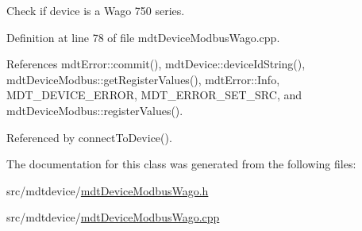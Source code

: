 Check if device is a Wago 750 series. 



Definition at line 78 of file mdt\-Device\-Modbus\-Wago.\-cpp.



References mdt\-Error\-::commit(), mdt\-Device\-::device\-Id\-String(), mdt\-Device\-Modbus\-::get\-Register\-Values(), mdt\-Error\-::\-Info, M\-D\-T\-\_\-\-D\-E\-V\-I\-C\-E\-\_\-\-E\-R\-R\-O\-R, M\-D\-T\-\_\-\-E\-R\-R\-O\-R\-\_\-\-S\-E\-T\-\_\-\-S\-R\-C, and mdt\-Device\-Modbus\-::register\-Values().



Referenced by connect\-To\-Device().



The documentation for this class was generated from the following files\-:\begin{DoxyCompactItemize}
\item 
src/mdtdevice/\hyperlink{mdt_device_modbus_wago_8h}{mdt\-Device\-Modbus\-Wago.\-h}\item 
src/mdtdevice/\hyperlink{mdt_device_modbus_wago_8cpp}{mdt\-Device\-Modbus\-Wago.\-cpp}\end{DoxyCompactItemize}
